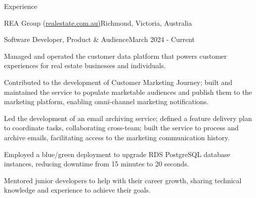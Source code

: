 \documentclass{cv}
\begin{document}
\begin{cvsection}{Experience}

\begin{cvheading}{REA Group (\href{https://realestate.com.au/}{realestate.com.au)}}{Richmond, Victoria, Australia}
\begin{cvsubheading}{Software Developer, Product \& Audience}{March 2024 - Current}
\item Managed and operated the customer data platform that powers customer experiences for real estate businesses and individuals.
\item Contributed to the development of Customer Marketing Journey; built and maintained the service to populate marketable audiences and publish them to the marketing platform, enabling omni-channel marketing notifications.
\item Led the development of an email archiving service; defined a feature delivery plan to coordinate tasks, collaborating cross-team; built the service to process and archive emails, facilitating access to the marketing communication history.
\item Employed a blue/green deployment to upgrade RDS PostgreSQL database instances, reducing downtime from 15 minutes to 20 seconds.
\item Mentored junior developers to help with their career growth, sharing technical knowledge and experience to achieve their goals.
\end{cvsubheading}
\end{cvheading}


\end{cvsection}
\end{document}
